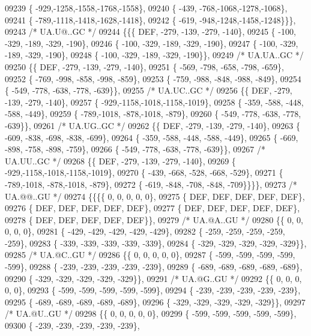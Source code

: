 \begin{DoxyCode}
09239 \{ -929,-1258,-1558,-1768,-1558\},
09240 \{ -439, -768,-1068,-1278,-1068\},
09241 \{ -789,-1118,-1418,-1628,-1418\},
09242 \{ -619, -948,-1248,-1458,-1248\}\}\},
09243 \textcolor{comment}{/* UA.U@..GC */}
09244 \{\{\{  DEF, -279, -139, -279, -140\},
09245 \{ -100, -329, -189, -329, -190\},
09246 \{ -100, -329, -189, -329, -190\},
09247 \{ -100, -329, -189, -329, -190\},
09248 \{ -100, -329, -189, -329, -190\}\},
09249 \textcolor{comment}{/* UA.UA..GC */}
09250 \{\{  DEF, -279, -139, -279, -140\},
09251 \{ -569, -798, -658, -798, -659\},
09252 \{ -769, -998, -858, -998, -859\},
09253 \{ -759, -988, -848, -988, -849\},
09254 \{ -549, -778, -638, -778, -639\}\},
09255 \textcolor{comment}{/* UA.UC..GC */}
09256 \{\{  DEF, -279, -139, -279, -140\},
09257 \{ -929,-1158,-1018,-1158,-1019\},
09258 \{ -359, -588, -448, -588, -449\},
09259 \{ -789,-1018, -878,-1018, -879\},
09260 \{ -549, -778, -638, -778, -639\}\},
09261 \textcolor{comment}{/* UA.UG..GC */}
09262 \{\{  DEF, -279, -139, -279, -140\},
09263 \{ -609, -838, -698, -838, -699\},
09264 \{ -359, -588, -448, -588, -449\},
09265 \{ -669, -898, -758, -898, -759\},
09266 \{ -549, -778, -638, -778, -639\}\},
09267 \textcolor{comment}{/* UA.UU..GC */}
09268 \{\{  DEF, -279, -139, -279, -140\},
09269 \{ -929,-1158,-1018,-1158,-1019\},
09270 \{ -439, -668, -528, -668, -529\},
09271 \{ -789,-1018, -878,-1018, -879\},
09272 \{ -619, -848, -708, -848, -709\}\}\}\},
09273 \textcolor{comment}{/* UA.@@..GU */}
09274 \{\{\{\{    0,    0,    0,    0,    0\},
09275 \{  DEF,  DEF,  DEF,  DEF,  DEF\},
09276 \{  DEF,  DEF,  DEF,  DEF,  DEF\},
09277 \{  DEF,  DEF,  DEF,  DEF,  DEF\},
09278 \{  DEF,  DEF,  DEF,  DEF,  DEF\}\},
09279 \textcolor{comment}{/* UA.@A..GU */}
09280 \{\{    0,    0,    0,    0,    0\},
09281 \{ -429, -429, -429, -429, -429\},
09282 \{ -259, -259, -259, -259, -259\},
09283 \{ -339, -339, -339, -339, -339\},
09284 \{ -329, -329, -329, -329, -329\}\},
09285 \textcolor{comment}{/* UA.@C..GU */}
09286 \{\{    0,    0,    0,    0,    0\},
09287 \{ -599, -599, -599, -599, -599\},
09288 \{ -239, -239, -239, -239, -239\},
09289 \{ -689, -689, -689, -689, -689\},
09290 \{ -329, -329, -329, -329, -329\}\},
09291 \textcolor{comment}{/* UA.@G..GU */}
09292 \{\{    0,    0,    0,    0,    0\},
09293 \{ -599, -599, -599, -599, -599\},
09294 \{ -239, -239, -239, -239, -239\},
09295 \{ -689, -689, -689, -689, -689\},
09296 \{ -329, -329, -329, -329, -329\}\},
09297 \textcolor{comment}{/* UA.@U..GU */}
09298 \{\{    0,    0,    0,    0,    0\},
09299 \{ -599, -599, -599, -599, -599\},
09300 \{ -239, -239, -239, -239, -239\},

\end{DoxyCode}
